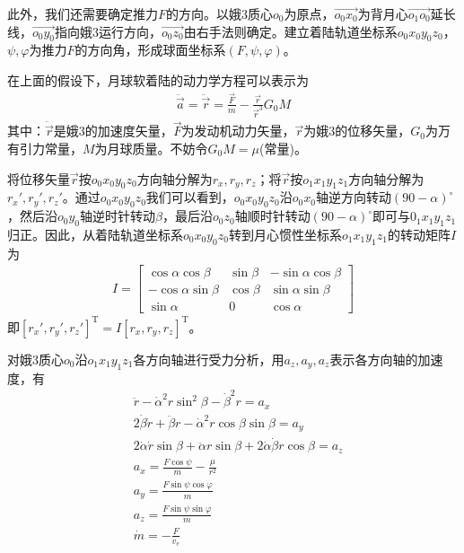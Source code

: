             \par
            此外，我们还需要确定推力$F$的方向。以娥3质心$o_0$为原点，$\overrightarrow{o_0x_0}$为背月心$\overrightarrow{o_1o_0}$延长线，$\overrightarrow{o_0y_0}$指向娥3运行方向，$\overrightarrow{o_0z_0}$由右手法则确定。建立着陆轨道坐标系$o_0x_0y_0z_0$，$\psi,\varphi$为推力$F$的方向角，形成球面坐标系$(F,\psi,\varphi)$。
            \par
            在上面的假设下，月球软着陆的动力学方程可以表示为
            \begin{align*}
            \ddot{\vec{a}} = \ddot{\vec{r}} = \frac{\vec{F}}{m} - \frac{\vec{r}}{\vec{r}^3}G_0M
            \end{align*}
            其中：$\ddot{\vec{r}}$是娥3的加速度矢量，$\vec{F}$为发动机动力矢量，$\vec{r}$为娥3的位移矢量，$G_0$为万有引力常量，$M$为月球质量。不妨令$G_0M = \mu$(常量)。
            \par
            将位移矢量$\vec{r}$按$o_0x_0y_0z_0$方向轴分解为$r_x,r_y,r_z$；将$\vec{r}$按$o_1x_1y_1z_1$方向轴分解为$r_x',r_y',r_z'$。通过$o_0x_0y_0z_0$我们可以看到，$o_0x_0y_0z_0$沿$o_0x_0$轴逆方向转动$(90-\alpha)^\circ$，然后沿$o_0y_0$轴逆时针转动$\beta$，最后沿$o_0z_0$轴顺时针转动$(90-\alpha)^\circ$即可与$0_1x_1y_1z_1$归正。因此，从着陆轨道坐标系$o_0x_0y_0z_0$转到月心惯性坐标系$o_1x_1y_1z_1$的转动矩阵$I$为
            \begin{align*}
            I = \begin{bmatrix}
            \cos\alpha\cos\beta& \sin \beta& -\sin \alpha\cos\beta\\
            -\cos\alpha\sin\beta & \cos\beta& \sin\alpha\sin\beta\\
            \sin\alpha&0&\cos\alpha
            \end{bmatrix}
            \end{align*}
            即$[r_x',r_y',r_z']^\mathrm{T} = I[r_x,r_y,r_z]^\mathrm{T}$。
            \par
            对娥3质心$o_0$沿$o_1x_1y_1z_1$各方向轴进行受力分析，用$a_z,a_y,a_z$表示各方向轴的加速度，有
            \begin{align*}
            & \ddot{r} -\dot{\alpha}^2 r\sin ^2\beta - \dot{\beta}^2r=a_x\\
            & 2\dot{\beta}\dot{r}+\ddot{\beta}r-\dot{\alpha}^2r\cos\beta\sin \beta = a_y\\
            & 2\dot{\alpha}\dot{r}\sin \beta + \ddot{\alpha}r\sin \beta + 2\dot{\alpha}\dot{\beta}r\cos\beta = a_z\\
            & a_x = \frac{F\cos\psi}{m} - \frac{\mu}{r^2}\\
            & a_y = \frac{F\sin\psi\cos\varphi}{m}\\
            & a_z = \frac{F\sin\psi\sin\varphi}{m}\\
            & \dot{m} = -\frac{F}{v_e}
            \end{align*}
